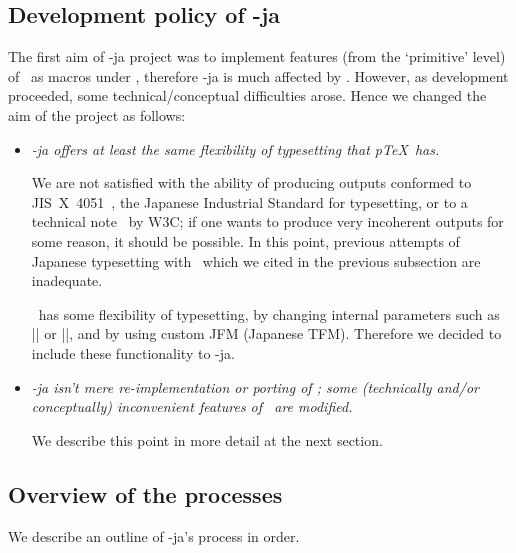 \documentclass{ajt}
\begin{document}
\subsection{Development policy of \LuaTeX-ja}
\label{ssec-pol} 
The first aim of \LuaTeX-ja project was to implement features (from the
`primitive' level) of \pTeX\ as macros under \LuaTeX, therefore \LuaTeX-ja is
much affected by \pTeX.  However, as development proceeded, some
technical/conceptual difficulties arose. Hence we changed the aim
of the project as follows:
\begin{itemize}
\item\emph{\LuaTeX-ja offers at least the same flexibility of
     typesetting that p\TeX\ has.}

     We are not satisfied with the ability of producing outputs conformed to
     JIS~X~4051~\cite{jisx4051}, the Japanese Industrial Standard for
     typesetting, or to a technical note~\cite{w3c} by W3C;
     if one wants to produce very incoherent outputs for some reason, it
     should be possible.
In this point, previous attempts of Japanese typesetting with \LuaTeX\
     which we cited in the previous subsection are inadequate.

\pTeX\ has some flexibility of typesetting, by changing internal
     parameters such as |\kanjiskip| or |\prebreakpenalty|, and by using
     custom JFM (Japanese TFM). Therefore we decided to include these
     functionality to \LuaTeX-ja.

\item\emph{\LuaTeX-ja isn't mere re-implementation or porting of \pTeX;
     some (technically and/or conceptually) inconvenient features of
     \pTeX\ are modified.} 

     We describe this point in more detail at the next section.
\end{itemize}


\subsection{Overview of the processes}
\label{ssec-over}
We describe an outline of \LuaTeX-ja's process in order.
\end{document}
